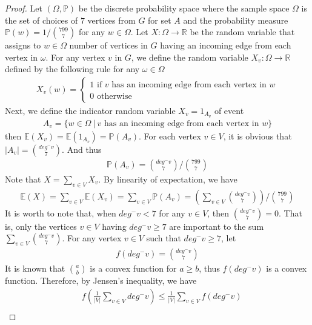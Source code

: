 \begin{proof}
  Let $(\Omega, \mathbb{P})$ be the discrete probability space where the sample space $\Omega$ is the set of choices of $7$ vertices from $G$ for set $A$ and the probability measure $\mathbb{P}(w) = 1 / \binom{799}{7}$ for any $w \in \Omega$. Let $X: \Omega \to \mathbb{R}$ be the random variable that assigns to $ w \in \Omega$ number of vertices in $G$ having an incoming edge from each vertex in $\omega$. For any vertex $v$ in $G$, we define the random variable $X_{v}: \Omega \to \mathbb{R}$ defined by the following rule for any $\omega \in \Omega$
  \begin{align*}
    X_{v}(w) = 
    \begin{cases}
      1 \text{ if $v$ has an incoming edge from each vertex in $w$} \\
      0 \text{ otherwise}
    \end{cases}
  \end{align*}
  Next, we define the indicator random variable $X_{v} = 1_{A_{v}}$ of event
  \begin{align*}
    A_{v} = \{w \in \Omega \ | \ v  \text{ has an incoming edge from each vertex in $w$}\} 
  \end{align*}
  then $\mathbb{E}(X_{v}) = \mathbb{E}(1_{A_{v}}) = \mathbb{P}(A_{v})$. For each vertex $v \in V$, it is obvious that $|A_{v}| = \binom{deg^{-}v}{7}$. And thus
  \begin{align*}
    \mathbb{P}(A_{v}) = \binom{deg^{-}v}{7} / \binom{799}{7}
  \end{align*}
  Note that $X = \sum_{v \in V} X_{v}$. By linearity of expectation, we have
  \begin{align*}
    \mathbb{E}(X) = \sum_{v \in V} \mathbb{E}(X_{v}) = \sum_{v \in V} \mathbb{P}(A_{v}) = (\sum_{v \in V} \binom{deg^{-}v}{7}) / \binom{799}{7} \tag{1.1}
  \end{align*}
  It is worth to note that, when $deg^{-}v < 7$ for any $v \in V$, then $\binom{deg^{-}v}{7}=0$. That is, only the vertices $v \in V$ having $deg^{-}v \geq 7$ are important to the sum $\sum_{v \in V} \binom{deg^{-}v}{7}$. For any vertex $v \in V$ such that $deg^{-}v \geq 7$, let
  \begin{align*}
    f(deg^{-}v) = \binom{deg^{-}v}{7}
  \end{align*}
  It is known that $\binom{a}{b}$ is a convex function for $a \geq b$, thus $f(deg^{-}v)$ is a convex function. Therefore, by Jensen's inequality, we have
  \begin{align*}
    &\ f(\frac{1}{|V|} \sum_{v \in V} deg^{-}v) \leq \frac{1}{|V|} \sum_{v \in V} f(deg^{-}v) \\

\end{align*}
\end{proof}

